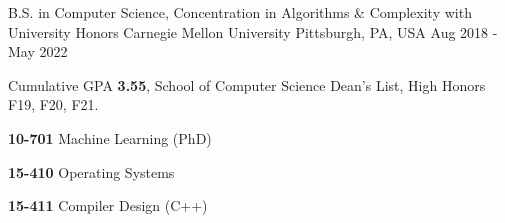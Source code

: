 

\begin{cventries}

  \eduentry
    {B.S. in Computer Science, Concentration in Algorithms \& Complexity
	with University Honors } %
    {Carnegie Mellon University} %
    {Pittsburgh, PA, USA} %
    {Aug 2018 - May 2022} %
    {
      \begin{cvitems} %
      \item {Cumulative GPA \textbf{3.55}, School of Computer Science Dean's List, High Honors F19, F20, F21. }
      \item {}
        \setlength\multicolsep{0pt}
        \begin{multicols}{3}
          \item[] {\textbf{10-701} Machine Learning (PhD)}
          \item[] {\textbf{15-410} Operating Systems}
          \item[] {\textbf{15-411} Compiler Design (C++)}

\end{multicols}
\end{cvitems}}
\end{cventries}
